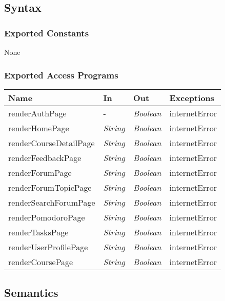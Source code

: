 \documentclass[12pt, titlepage]{article}
\begin{document}
\subsection{Syntax}

\subsubsection{Exported Constants}
None

\subsubsection{Exported Access Programs}

\begin{center}
\begin{tabular}{p{4cm} p{3cm} p{3cm} p{3cm}}
\hline
\textbf{Name} & \textbf{In} & \textbf{Out} & \textbf{Exceptions} \\
\hline
renderAuthPage&  - & \textit{Boolean} & internetError \\
renderHomePage&  \textit{String} & \textit{Boolean} & internetError \\
renderCourseDetailPage&  \textit{String} & \textit{Boolean} & internetError \\
renderFeedbackPage&  \textit{String} & \textit{Boolean} & internetError \\
renderForumPage&  \textit{String} & \textit{Boolean} & internetError \\
renderForumTopicPage&  \textit{String} & \textit{Boolean} & internetError \\
renderSearchForumPage&  \textit{String} & \textit{Boolean} & internetError \\
renderPomodoroPage&  \textit{String} & \textit{Boolean} & internetError \\
renderTasksPage&  \textit{String} & \textit{Boolean} & internetError \\
renderUserProfilePage&  \textit{String} & \textit{Boolean} & internetError \\
renderCoursePage&  \textit{String} & \textit{Boolean} & internetError \\

\hline
\end{tabular}
\end{center}

\subsection{Semantics}
\end{document}
